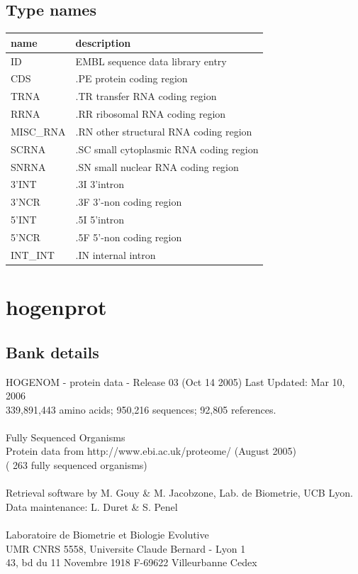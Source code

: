 \documentclass{article}
\begin{document}
\begin{Schunk}
\subsection{Type names}
\noindent\begin{tabular}{ll}
\hline \hline
name & description\\
\hline
ID & EMBL sequence data library entry \\
CDS & .PE protein coding region \\
TRNA & .TR transfer RNA coding region \\
RRNA & .RR ribosomal RNA coding region \\
MISC\_RNA & .RN other structural RNA coding region \\
SCRNA & .SC small cytoplasmic RNA coding region \\
SNRNA & .SN small nuclear RNA coding region \\
3'INT & .3I 3'intron \\
3'NCR & .3F  3'-non coding region \\
5'INT & .5I 5'intron \\
5'NCR & .5F  5'-non coding region \\
INT\_INT & .IN  internal intron \\
\hline \hline
\end{tabular}

\section{ hogenprot }
\subsection{Bank details}
HOGENOM - protein data - Release 03 (Oct 14 2005) Last Updated: Mar 10, 2006\\
339,891,443 amino acids; 950,216 sequences; 92,805 references.\\
\\
Fully Sequenced Organisms\\
Protein data from http://www.ebi.ac.uk/proteome/ (August 2005)\\
( 263 fully sequenced organisms)\\
\\
Retrieval software by M. Gouy \& M. Jacobzone, Lab. de Biometrie, UCB Lyon.\\
Data maintenance: L. Duret \& S. Penel\\
\\
Laboratoire de Biometrie et Biologie Evolutive\\
UMR CNRS 5558, Universite Claude Bernard - Lyon 1\\
43, bd du 11 Novembre 1918 F-69622 Villeurbanne Cedex\\



\end{Schunk}
\end{document}
